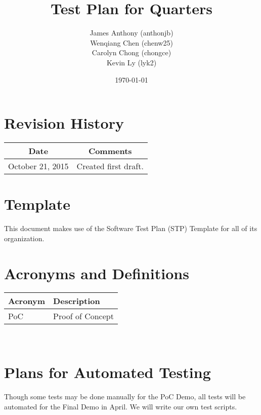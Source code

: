 \documentclass[12pt]{article}
\begin{document}
\title{Test Plan for Quarters} 
\author{James Anthony (anthonjb)\\ Wenqiang Chen (chenw25)\\ Carolyn Chong 
(chongce)\\ Kevin Ly (lyk2)}
\date{\today}
	
\maketitle

\pagebreak

\tableofcontents

\section*{Revision History}
\begin{tabular}{|c|c|}
\hline
\textbf{Date}  & \textbf{Comments} \\ \hline
October 21, 2015 & Created first draft. \\ 
\hline
\end{tabular}

\section*{Template}
This document makes use of the Software Test Plan (STP) Template for all of its organization.

\pagebreak


\section{Acronyms and Definitions}
\renewcommand{\arraystretch}{1.2}
\begin{tabular}{l l} 
  \toprule		
  \textbf{Acronym} & \textbf{Description}\\
  \midrule 
  PoC		&Proof of Concept\\
  \bottomrule
\end{tabular}\\


\section{Plans for Automated Testing}
Though some tests may be done manually for the PoC Demo, all tests will be automated for the Final Demo in April. We will write our own test scripts.
\end{document}
